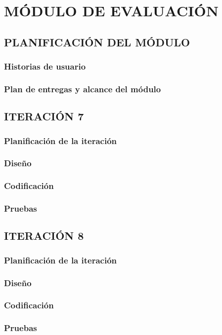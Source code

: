 \chapter{MÓDULO DE EVALUACIÓN}

\section{PLANIFICACIÓN DEL MÓDULO}

\subsection{Historias de usuario}

\subsection{Plan de entregas y alcance del módulo}

\section{ITERACIÓN 7}

\subsection{Planificación de la iteración}

\subsection{Diseño}

\subsection{Codificación}

\subsection{Pruebas}

\section{ITERACIÓN 8}

\subsection{Planificación de la iteración}

\subsection{Diseño}

\subsection{Codificación}

\subsection{Pruebas}
